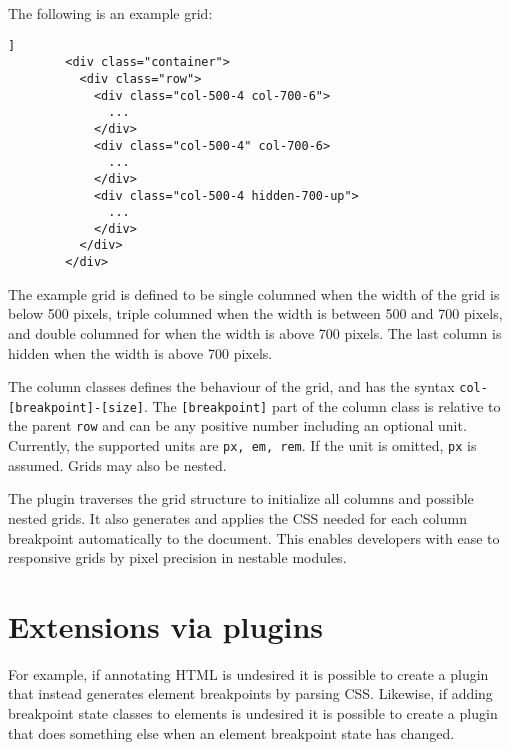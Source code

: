 \documentclass{acm_proc_article-sp}
\newcommand{\code}[1]{\texttt{#1}}
\begin{document}
      The following is an example grid:

      

      
      \begin{lstlisting}[gobble=8,caption={},captionpos=b,label={}]]
        <div class="container">
          <div class="row">
            <div class="col-500-4 col-700-6">
              ...
            </div>
            <div class="col-500-4" col-700-6>
              ...
            </div>
            <div class="col-500-4 hidden-700-up">
              ...
            </div>
          </div>
        </div>
      \end{lstlisting}

      The example grid is defined to be single columned when the width of the grid is below 500 pixels, triple columned when the width is between 500 and 700 pixels, and double columned for when the width is above 700 pixels.
      The last column is hidden when the width is above 700 pixels.

      The column classes defines the behaviour of the grid, and has the syntax \code{col-[breakpoint]-[size]}.
      The \code{[breakpoint]} part of the column class is relative to the parent \code{row} and can be any positive number including an optional unit.
      Currently, the supported units are \code{px, em, rem}.
      If the unit is omitted, \code{px} is assumed.
      Grids may also be nested.

      The plugin traverses the grid structure to initialize all columns and possible nested grids.
      It also generates and applies the CSS needed for each column breakpoint automatically to the document.
      This enables developers with ease to responsive grids by pixel precision in nestable modules.

\section{Extensions via plugins}\label{sec:plugins}
  For example, if annotating HTML is undesired it is possible to create a plugin that instead generates element breakpoints by parsing CSS.
  Likewise, if adding breakpoint state classes to elements is undesired it is possible to create a plugin that does something else when an element breakpoint state has changed.
\end{document}
